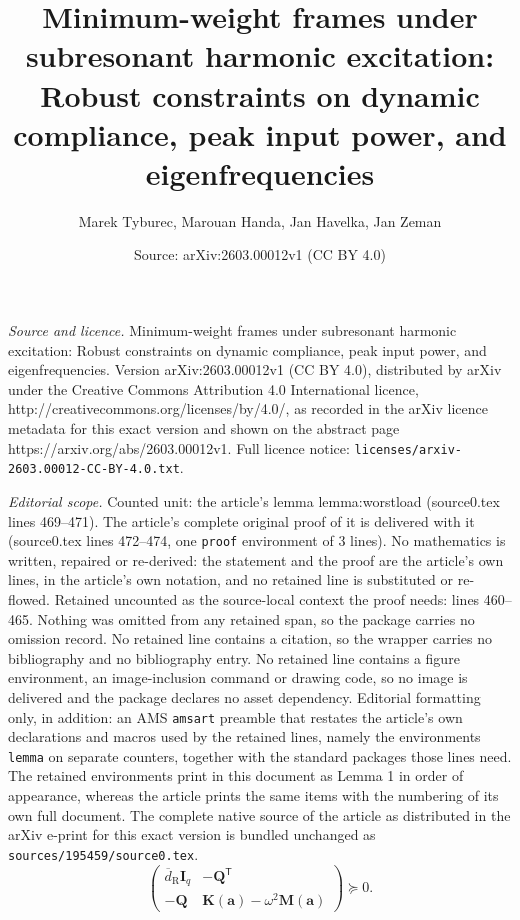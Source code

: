\documentclass[10pt,a4paper]{amsart}
\title{Minimum-weight frames under subresonant harmonic excitation: Robust constraints on dynamic compliance, peak input power, and eigenfrequencies}
\author{Marek Tyburec, Marouan Handa, Jan Havelka, Jan Zeman}
\date{Source: arXiv:2603.00012v1 (CC BY 4.0)}
\newcommand{\R}{\mathrm{R}}
\newcommand{\T}{^{\mathsf T}}
\begin{document}
\maketitle

\noindent\emph{Source and licence.} Minimum-weight frames under subresonant harmonic excitation: Robust constraints on dynamic compliance, peak input power, and eigenfrequencies. Version arXiv:2603.00012v1 (CC BY 4.0), distributed by arXiv under the Creative Commons Attribution 4.0 International licence, http://creativecommons.org/licenses/by/4.0/, as recorded in the arXiv licence metadata for this exact version and shown on the abstract page https://arxiv.org/abs/2603.00012v1. Full licence notice: \texttt{licenses/arxiv-2603.00012-CC-BY-4.0.txt}.\par\smallskip

\noindent\textit{Editorial scope.} Counted unit: the article's lemma lemma:worstload (source0.tex lines 469--471). The article's complete original proof of it is delivered with it (source0.tex lines 472--474, one \texttt{proof} environment of 3 lines). No mathematics is written, repaired or re-derived: the statement and the proof are the article's own lines, in the article's own notation, and no retained line is substituted or re-flowed.  Retained uncounted as the source-local context the proof needs: lines 460--465.  Nothing was omitted from any retained span, so the package carries no omission record.  No retained line contains a citation, so the wrapper carries no bibliography and no bibliography entry.  No retained line contains a figure environment, an image-inclusion command or drawing code, so no image is delivered and the package declares no asset dependency.  Editorial formatting only, in addition: an AMS \texttt{amsart} preamble that restates the article's own declarations and macros used by the retained lines, namely the environments \texttt{lemma} on separate counters, together with the standard packages those lines need.  The retained environments print in this document as Lemma 1 in order of appearance, whereas the article prints the same items with the numbering of its own full document.  The complete native source of the article as distributed in the arXiv e-print for this exact version is bundled unchanged as \texttt{sources/195459/source0.tex}.
\begin{equation}\label{eq:robustdynamiccompliance}
  \begin{pmatrix}
    \overline{d}_\R\mathbf{I}_q & -\mathbf{Q}\T\\
    -\mathbf{Q}  & \mathbf{K}(\mathbf{a}) - \omega^2 \mathbf{M}(\mathbf{a})
  \end{pmatrix}\succeq 0.
\end{equation}
\end{document}
